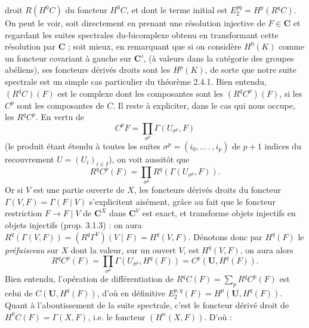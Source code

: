 
\noindent droit $R(H^0C)$ du foncteur $H^0C$, et dont le terme initial est
$E_2^{pq}=H^p(R^qC)$.
On peut le voir, soit directement en prenant une résolution injective de
$F\in\mathbf C$ et regardant les suites spectrales du-bicomplexe obtenu en
transformant cette résolution par $\mathbf C$ ; soit mieux, en remarquant que si on
considère $H^0(K)$ comme un foncteur covariant à gauche sur $\mathbf C'$, (à valeurs
dans la catégorie des groupes abéliens), ses foncteurs dérivés droits sont les
$H^p(K)$, de sorte que notre suite spectrale est un simple cas particulier du
théorème 2.4.1. Bien entendu, $(R^qC)(F)$ est le complexe dont les composantes
sont les $(R^qC^p)(F)$, si les $C^p$ sont les composantes de $C$. Il reste à
expliciter, dans le cas qui nous occupe, les $R^qC^p$. En vertu de
\[
C^pF=\prod_{\sigma^p}\Gamma(U_{\sigma^p},F)
\]
(le produit étant étendu à toutes les suites
$\sigma^p=(i_0,\ldots\mathpunct{.},i_p)$ de $p+1$ indices du recouvrement
$U=(U_i)_{i\in I}$), on voit aussitôt que
\[
R^qC^p(F)=\prod_{\sigma^p}R^q(\Gamma(U_{\sigma^p},F)).
\]
Or si $V$ est une partie ouverte de $X$, les foncteurs dérivés droits du
foncteur $\Gamma(V,F)=\Gamma(F\mid V)$ s'explicitent aisément, grâce au fait
que le foncteur restriction $F\to F\mid V$ de $\mathbf C^X$ dans $\mathbf C^V$ est
exact, et transforme objets injectifs en objets injectifs (prop. 3.1.3) : on
aura
$R^q(\Gamma(V,F))=(R^q\Gamma^V)(V\mid F)=H^q(V,F)$.
Dénotons donc par $H^q(F)$ le \textit{préfaisceau} sur $X$ dont la valeur,
sur un ouvert $V$, est $H^q(V,F)$, on aura alors
\[
R^qC^p(F)=\prod_{\sigma^p}\Gamma(U_{\sigma^p},H^q(F))
=C^p(\mathbf U,H^q(F)).
\]
Bien entendu, l'opération de différentiation de
$R^qC(F)=\displaystyle\sum\limits_p R^qC^p(F)$ est celui de $C(\mathbf U,H^q(F))$, d'où en
définitive
$E_2^{p,q}(F)=H^p(\mathbf U,H^q(F))$.
Quant à l'aboutissement de la suite spectrale, c'est le foncteur dérivé droit
de $H^0C(F)=\Gamma(X,F)$, i.e. le foncteur $(H^n(X,F))$. D'où :

